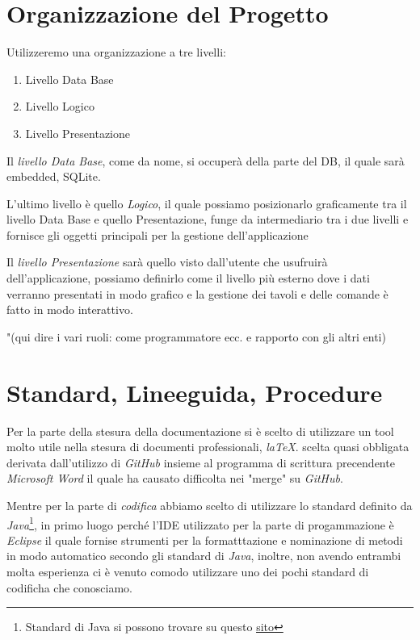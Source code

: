 \documentclass{book}
\begin{document}
\section{Organizzazione del Progetto}

Utilizzeremo una organizzazione a tre livelli:

\begin{enumerate}
    \item Livello Data Base
    \item Livello Logico
    \item Livello Presentazione
\end{enumerate}
Il \textit{livello Data Base}, come da nome, si occuperà della parte del DB, il quale sarà embedded, SQLite.

L'ultimo livello è quello \textit{Logico}, il quale possiamo posizionarlo graficamente tra il livello Data Base e quello Presentazione, funge da intermediario tra i due livelli e fornisce gli oggetti principali per la gestione dell'applicazione

Il \textit{livello Presentazione} sarà quello visto dall'utente che usufruirà dell'applicazione, possiamo definirlo come il livello più esterno dove i dati verranno presentati in modo grafico e la gestione dei tavoli e delle comande è fatto in modo interattivo.

"(qui dire i vari ruoli: come programmatore ecc. e rapporto con gli altri enti)

\section{Standard, Lineeguida, Procedure}

Per la parte della stesura della documentazione si è scelto di utilizzare un tool molto utile nella stesura di documenti professionali, \textit{laTeX}. scelta quasi obbligata derivata dall'utilizzo di \textit{GitHub} insieme al programma di scrittura precendente \textit{Microsoft Word} il quale ha causato difficolta nei "merge" su \textit{GitHub}.

 Mentre per la parte di \textit{codifica} abbiamo scelto di utilizzare lo standard definito da \textit{Java}\footnote{Standard di Java si possono trovare su questo \href{https://www.oracle.com/java/technologies/javase/codeconventions-contents.html}{\underline{sito}}}, in primo luogo perché l'IDE utilizzato per la parte di progammazione è \textit{Eclipse} il quale fornise strumenti per la formatttazione e nominazione di metodi in modo automatico secondo gli standard di \textit{Java}, inoltre, non avendo entrambi molta esperienza ci è venuto comodo utilizzare uno dei pochi standard di codificha che conosciamo.
\end{document}
